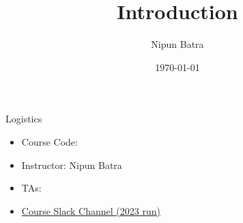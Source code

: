 \documentclass[handout]{beamer}
\begin{document}
\title{Introduction}
\author{Nipun Batra}
\date{\today}
\maketitle

\begin{frame}{Logistics}
    \begin{itemize}
        \item Course Code: 
        \item Instructor: Nipun Batra
        \item TAs: 
        \item \href{https://join.slack.com/t/slack-bqw5449/shared_invite/zt-1zhmk3ssi-KDb2d0iyikx1tVGiup8sRg}{Course Slack Channel (2023 run)}
    \end{itemize}
    
\end{frame}


    


    
\end{document}
